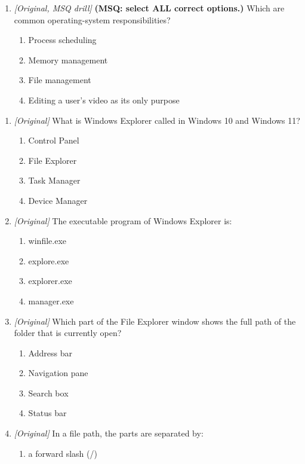 \begin{enumerate}[label=\textbf{Q\arabic*.}, leftmargin=*]
\item \textit{[Original, MSQ drill]} \textbf{(MSQ: select ALL correct options.)} Which are common operating-system responsibilities?
  \begin{enumerate}[label=\Alph*.]
\item Process scheduling
   \item Memory management
   \item File management
   \item Editing a user's video as its only purpose
  \end{enumerate}

\end{enumerate}
\begin{enumerate}[label=\textbf{Q\arabic*.}, leftmargin=*]
\item \textit{[Original]} What is Windows Explorer called in Windows 10 and
  Windows 11?
  \begin{enumerate}[label=\Alph*.]
    \item Control Panel
    \item File Explorer
    \item Task Manager
    \item Device Manager
  \end{enumerate}
\item \textit{[Original]} The executable program of Windows Explorer is:
  \begin{enumerate}[label=\Alph*.]
    \item winfile.exe
    \item explore.exe
    \item explorer.exe
    \item manager.exe
  \end{enumerate}
\item \textit{[Original]} Which part of the File Explorer window shows the
  full path of the folder that is currently open?
  \begin{enumerate}[label=\Alph*.]
    \item Address bar
    \item Navigation pane
    \item Search box
    \item Status bar
  \end{enumerate}
\item \textit{[Original]} In a file path, the parts are separated by:
  \begin{enumerate}[label=\Alph*.]
    \item a forward slash (/)

\end{enumerate}
\end{enumerate}
